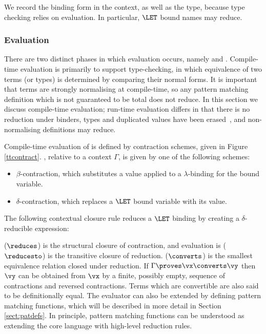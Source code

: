 \noindent
We record the binding form in the context, as well as the type,
because type checking relies on evaluation. In particular, $\LET$ bound
names may reduce.

\subsubsection{Evaluation}

\label{sect:evaluation}

There are two distinct phases in which \TT{} evaluation occurs, namely
 and . Compile-time evaluation is primarily
to support type-checking, in which equivalence of two terms (or types) is
determined by comparing their normal forms. It is important that terms are
strongly normalising at compile-time, so any pattern matching definition which
is not guaranteed to be total does not reduce. In this section we discuss
compile-time evaluation; run-time evaluation differs in that there is no
reduction under binders, types and duplicated values have been
erased~\cite{Brady2003}, and non-normalising definitions may reduce. 

Compile-time evaluation of \TT{} is defined by contraction schemes, given in
Figure \ref{ttcontract}. , relative to a context $\Gamma$,
is given by one of the following schemes:

\begin{itemize}
\item $\beta$-contraction, which substitutes a value applied to a $\lambda$-binding for
the bound variable. 
\item $\delta$-contraction, which replaces a $\LET$ bound variable with its value.
\end{itemize}

\noindent
The following contextual closure rule reduces a $\LET$ binding by creating
a $\delta$-reducible expression:


 ($\reduces$) is the structural closure of contraction, and evaluation
is ($\reducesto$) is the transitive closure of reduction.  ($\converts$)
is the smallest equivalence relation closed under reduction. If $\Gamma\proves\vx\converts\vy$
then $\vy$ can be obtained from $\vx$ by a finite, possibly empty, sequence of
contractions and reversed contractions. Terms which are convertible are also said to
be definitionally equal.
The evaluator can also be extended by defining pattern matching functions, which
will be described in more detail in Section \ref{sect:patdefs}. In principle, pattern
matching functions can be understood as extending the core language with high-level
reduction rules.

